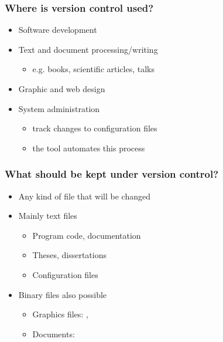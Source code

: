 \begin{frame}
\frametitle{Where is version control used?}
    \begin{itemize}
    \item Software development
    \item Text and document processing/writing
        \begin{itemize}
            \item e.g. books, scientific articles, talks
        \end{itemize}
    \item Graphic and web design
    \item System administration
        \begin{itemize}
            \item track changes to configuration files
            \item the tool  automates this process
        \end{itemize}
    \end{itemize}
\end{frame}

\begin{frame}
\frametitle{What should be kept under version control?}
\begin{itemize}
    \item Any kind of file that will be changed
    \item Mainly text files
        \begin{itemize}
        \item Program code, documentation
        \item Theses, dissertations
        \item Configuration files
        \end{itemize}
    \item Binary files also possible
        \begin{itemize}
        \item Graphics files: , 
        \item Documents: 
        \end{itemize}
\end{itemize}
\end{frame}

\begin{frame}
\begin{itemize}
        \begin{itemize}
        \end{itemize}
\end{itemize}
\end{frame}

